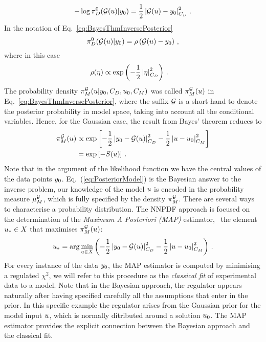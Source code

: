\begin{equation}
  \label{eq:LikelyChiSq}
  -\log\pi_D^0(\mathcal{G}(u)|y_0) =  
      \frac12 \left|
      \mathcal{G}(u) - y_0
      \right|_{C_{D}}^2
    \, .
\end{equation}
In the notation of Eq.~\ref{eq:BayesThmInversePosterior}
\begin{equation}
  \label{eq:IdentifyRho}
  \pi_D^0(\mathcal{G}(u)|y_0) = \rho\left(
    \mathcal{G}(u) - y_0
  \right)\, ,
\end{equation}
where in this case 
\begin{align}
  \label{eq:RhoGauss}
  \rho(\eta) &\propto \exp\left(
               -\frac12 \left|\eta\right|_{C_{D}}^2
               \right)\, .
\end{align}
The probability density
$\pi^{\mathcal{G}}_M(u|y_0,C_{D},u_0,C_M)$
was called $\pi_M^{\mathcal{G}}(u)$ in
Eq.~\ref{eq:BayesThmInversePosterior}, where the suffix $\mathcal{G}$ is a
short-hand to denote the posterior probability in model space, taking into
account all the conditional variables. Hence, for the Gaussian case, the result
from Bayes' theorem reduces to
\begin{align}
  \label{eq:PosteriorModel}
  \pi_M^{\mathcal{G}}(u) 
  &\propto 
  \exp\left[
    -\frac12 \left| y_0 - \mathcal{G}(u) \right|_{C_{D}} ^2
    -\frac12 \left| u - u_0 \right|_{C_M}^2
  \right] \\ 
  &= 
  \exp\left[
    - S(u)
  \right]\, .
\end{align}
Note that in the argument of the likelihood function we have the central values
of the data points $y_0$. Eq.~(\ref{eq:PosteriorModel}) is the
Bayesian answer to the inverse problem, our knowledge of the model $u$
is encoded in the probability measure $\mu_M^{\mathcal{G}}$, which is fully
specified by the density $\pi_M^{\mathcal{G}}$. There are several ways to
characterise a probability distribution. The NNPDF approach is focused on the
determination of the {\em Maximum A Posteriori (MAP)} estimator, \ie\ the
element $u_* \in X$ that maximises $\pi_M^{\mathcal{G}}(u)$:
\begin{align}
  \label{eq:MAP}
  u_* = \arg\min_{u \in X} 
  \left(
  -\frac12 \left| y_0 - \mathcal{G}(u) \right|_{C_{D}}^2
  -\frac12 \left| u - u_0 \right|_{C_M}^2
  \right)\, .
\end{align}
For every instance of the data $y_0$, the MAP estimator is computed by
minimising a regulated $\chi^2$, we will refer to this procedure as the {\em
classical fit} of experimental data to a model. Note that in the Bayesian
approach, the regulator appears naturally after having specified carefully all
the assumptions that enter in the prior. In this specific example the regulator
arises from the Gaussian prior for the model input $u$, which is
normally ditributed around a solution $u_0$. The MAP estimator
provides the explicit connection between the Bayesian approach and the classical
fit.

